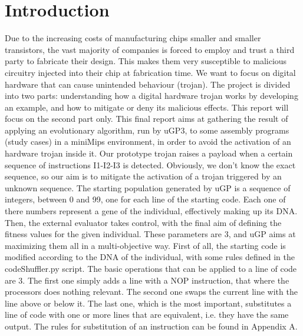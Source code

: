 \documentclass[a4paper,twoside]{article}
\author{Alessandro Salvato}
\theoremstyle{definition}
\theoremstyle{remark}
\newcommand{\paginavuota}{\newpage\null\thispagestyle{empty}\newpage\null}
\begin{document}

\paginavuota

\tableofcontents
\newpage

\section{Introduction}

Due to the increasing costs of manufacturing chips smaller and smaller transistors, the vast majority of companies is forced to employ and trust a third party to fabricate their design. This makes them very susceptible to malicious circuitry injected into their chip at fabrication time. We want to focus on digital hardware that can cause unintended behaviour (trojan). The project is divided into two parts: understanding how a digital hardware trojan works by developing an example, and how to mitigate or deny its malicious effects. This report will focus on the second part only.
This final report aims at gathering the result of applying an evolutionary algorithm, run by uGP3, to some assembly programs (study cases) in a miniMips environment, in order to avoid the activation of an hardware trojan inside it. Our prototype trojan raises a payload when a certain sequence of instructions I1-I2-I3 is detected. Obviously, we don't know the exact sequence, so our aim is to mitigate the activation of a trojan triggered by an unknown sequence. \newline
The starting population generated by uGP is a sequence of integers, between 0 and 99, one for each line of the starting code. Each one of there numbers represent a gene of the individual, effectively making up its DNA. \newline
Then, the external evaluator takes control, with the final aim of defining the fitness values for the given individual. These parameters are 3, and uGP aims at maximizing them all in a multi-objective way.\newline
First of all, the starting code is modified according to the DNA of the individual, with some rules defined in the codeShuffler.py script. The basic operations that can be applied to a line of code are 3. The first one simply adds a line with a NOP instruction, that where the processors does nothing relevant. The second one swaps the current line with the line above or below it. The last one, which is the most important, substitutes a line of code with one or more lines that are equivalent, i.e. they have the same output. The rules for substitution of an instruction can be found in Appendix A. \newline
\end{document}
